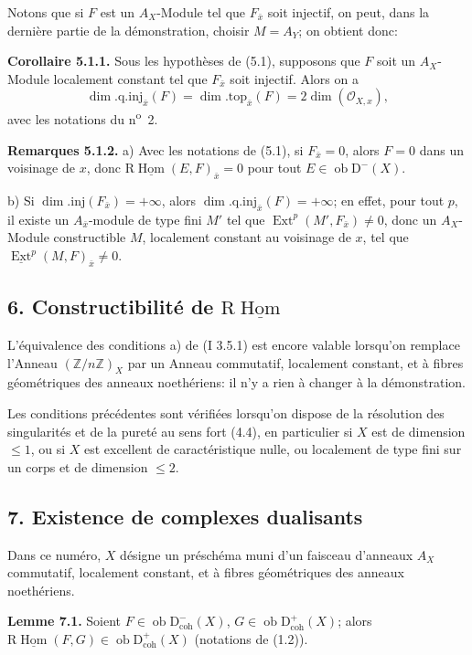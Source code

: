 \documentclass[11pt]{article}
\DeclareMathOperator{\Hom}{Hom}
\DeclareMathOperator{\Ext}{Ext}
\newcommand{\R}{\mathrm{R}}
\newcommand{\D}{\mathrm{D}}
\newcommand{\Z}{\mathbb{Z}}
\newcommand{\ob}{\operatorname{ob}}
\providecommand{\Hom}{\operatorname{Hom}}
\providecommand{\ob}{\operatorname{ob}}
\providecommand{\R}{\mathrm R}
\providecommand{\Z}{\mathbb Z}
\begin{document}
Notons que si $F$ est un $A_X$-Module tel que $F_{\bar{x}}$ soit injectif, on peut, dans la dernière partie de la démonstration, choisir $M=A_Y$; on obtient donc:

\textbf{Corollaire 5.1.1.} Sous les hypothèses de (5.1), supposons que $F$ soit un $A_X$-Module localement constant tel que $F_{\bar{x}}$ soit injectif. Alors on a
\[
        \dim.\mathrm{q.inj}_{\bar{x}}(F)=\dim.\mathrm{top}_{\bar{x}}(F)=2\dim(\mathcal{O}_{X,x}),
\]
avec les notations du n\textsuperscript{o}~2.

\textbf{Remarques 5.1.2.} a) Avec les notations de (5.1), si $F_{\bar{x}}=0$, alors $F=0$ dans un voisinage de $x$, donc $\R\underline{\Hom}(E,F)_{\bar{x}}=0$ pour tout $E\in\ob\D^{-}(X)$.

b) Si $\dim.\mathrm{inj}(F_{\bar{x}})=+\infty$, alors $\dim.\mathrm{q.inj}_{\bar{x}}(F)=+\infty$; en effet, pour tout $p$, il existe un $A_{\bar{x}}$-module de type fini $M'$ tel que $\Ext^p(M',F_{\bar{x}})\neq0$, donc un $A_X$-Module constructible $M$, localement constant au voisinage de $x$, tel que $\underline{\Ext}^p(M,F)_{\bar{x}}\neq0$.

\subsection*{6. Constructibilité de $\R\underline{\Hom}$}

L'équivalence des conditions a) de (I 3.5.1) est encore valable lorsqu'on remplace l'Anneau $(\Z/n\Z)_X$ par un Anneau commutatif, localement constant, et à fibres géométriques des anneaux noethériens: il n'y a rien à changer à la démonstration.

Les conditions précédentes sont vérifiées lorsqu'on dispose de la résolution des singularités et de la pureté au sens fort (4.4), en particulier si $X$ est de dimension $\leq1$, ou si $X$ est excellent de caractéristique nulle, ou localement de type fini sur un corps et de dimension $\leq2$.

\subsection*{7. Existence de complexes dualisants}

Dans ce numéro, $X$ désigne un préschéma muni d'un faisceau d'anneaux $A_X$ commutatif, localement constant, et à fibres géométriques des anneaux noethériens.

\textbf{Lemme 7.1.} Soient $F\in\ob\D^{-}_{\mathrm{coh}}(X)$, $G\in\ob\D^{+}_{\mathrm{coh}}(X)$; alors $\R\underline{\Hom}(F,G)\in\ob\D^{+}_{\mathrm{coh}}(X)$ (notations de (1.2)).
\end{document}
